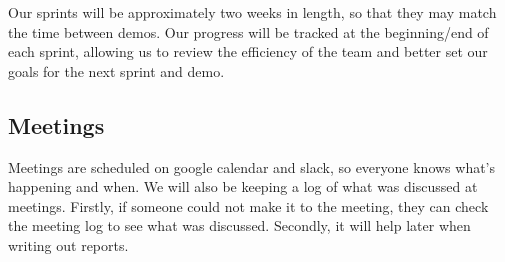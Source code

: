 \documentclass[onecolumn]{IEEEtran}
\begin{document}
Our sprints will be approximately two weeks in length, so that they may match the time between demos. Our progress will be tracked at the beginning/end of each sprint, allowing us to review the efficiency of the team and better set our goals for the next sprint and demo.

\subsection{Meetings}

Meetings are scheduled on google calendar and slack, so everyone knows what's happening and when. We will also be keeping a log of what was discussed at meetings. Firstly, if someone could not make it to the meeting, they can check the meeting log to see what was discussed. Secondly, it will help later when writing out reports.
\end{document}
